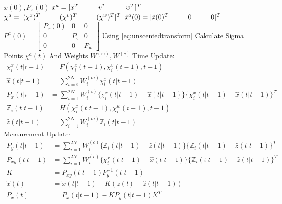 \begin{appendices}
\begin{algorithmic}
\State {} $\hat{x}(0), P_{x}(0)$
\State {} $x^a = [x^T \hspace*{1cm} v^T \hspace*{1cm} w^T]^T$
\State {} $\chi^a = [(\chi^x)^T  \hspace*{1cm} (\chi^v)^T  \hspace*{1cm} (\chi^w)^T]^T$
\State {} $\hat{x}^a(0) = [\hat{x}(0)^T  \hspace*{1cm} 0  \hspace*{1cm} 0]^T$
\State {} $P^a(0) =
\begin{bmatrix}
	P_{x}(0) & 0 & 0\\
	0 & P_v & 0\\
	0 & 0 & P_w
\end{bmatrix}$ 
  \State Using \ref{eq:unscentedtransform} Calculate Sigma Points $\chi^a(t)$ And Weights $W^{(m)}, W^{(c)}$
  \State Time Update:
  \begin{align*}
  	\chi_i^x(t\vert t-1) &= F(\chi_i^x(t-1), \chi_i^v(t-1), t-1)\\
  	\hat{x}(t\vert t-1) &= \sum_{i=0}^{2N} W_i^{(m)}\chi_i^x(t\vert t-1)\\
  	P_{x}(t\vert t-1) &= \sum_{i=1}^{2N} W_i^{(c)} \{\chi_i^x(t\vert t-1) - \hat{x}(t\vert t-1)\}\{\chi_i^x(t\vert t-1) - \hat{x}(t\vert t-1)\}^T\\
  	\mathbb{Z}_i(t\vert t-1) &= H(\chi_i^x(t\vert t-1), \chi_i^w(t-1), t-1)\\
  	\hat{z}(t\vert t-1) &= \sum_{i=1}^{2N} W_i^{(m)}\mathbb{Z}_i(t\vert t-1)
  \end{align*}
  \State Measurement Update:
  \begin{align*}
  	P_{y}(t\vert t-1) &= \sum_{i=1}^{2N}W_i^{(c)}\{\mathbb{Z}_i(t\vert t-1) - \hat{z}(t\vert t-1)\}\{\mathbb{Z}_i(t\vert t-1) - \hat{z}(t\vert t-1)\}^T\\
  	P_{xy}(t\vert t-1) &= \sum_{i=1}^{2N}W_i^{(c)}\{\chi_i^x(t\vert t-1) - \hat{x}(t\vert t-1)\}\{\mathbb{Z}_i(t\vert t-1) - \hat{z}(t\vert t-1)\}^T\\
  	K &= P_{xy}(t\vert t-1)P^{-1}_{y}(t\vert t-1)\\
  	\hat{x}(t) &= \hat{x}(t\vert t-1) + K(z(t) - \hat{z}(t\vert t-1))\\
  	P_{x}(t) &= P_{x}(t\vert t-1) - KP_{y}(t\vert t-1)K^T
  \end{align*}
\End
\end{algorithmic}


\end{appendices}
